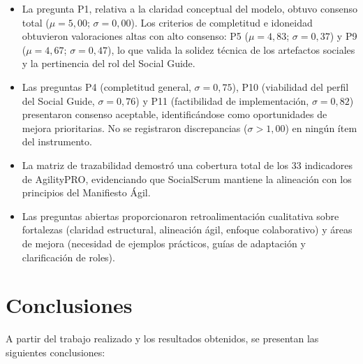 \begin{itemize}
    \item La pregunta P1, relativa a la claridad conceptual del modelo, obtuvo consenso total ($\mu = 5{,}00$; $\sigma = 0{,}00$). Los criterios de completitud e idoneidad obtuvieron valoraciones altas con alto consenso: P5 ($\mu = 4{,}83$; $\sigma = 0{,}37$) y P9 ($\mu = 4{,}67$; $\sigma = 0{,}47$), lo que valida la solidez técnica de los artefactos sociales y la pertinencia del rol del Social Guide.
    \item Las preguntas P4 (completitud general, $\sigma = 0{,}75$), P10 (viabilidad del perfil del Social Guide, $\sigma = 0{,}76$) y P11 (factibilidad de implementación, $\sigma = 0{,}82$) presentaron consenso aceptable, identificándose como oportunidades de mejora prioritarias. No se registraron discrepancias ($\sigma > 1{,}00$) en ningún ítem del instrumento.
    \item La matriz de trazabilidad demostró una cobertura total de los 33 indicadores de AgilityPRO, evidenciando que SocialScrum mantiene la alineación con los principios del Manifiesto Ágil.
    \item Las preguntas abiertas proporcionaron retroalimentación cualitativa sobre fortalezas (claridad estructural, alineación ágil, enfoque colaborativo) y áreas de mejora (necesidad de ejemplos prácticos, guías de adaptación y clarificación de roles).
\end{itemize}

\section{Conclusiones}
\label{sec:conclusiones}

A partir del trabajo realizado y los resultados obtenidos, se presentan las siguientes conclusiones:

